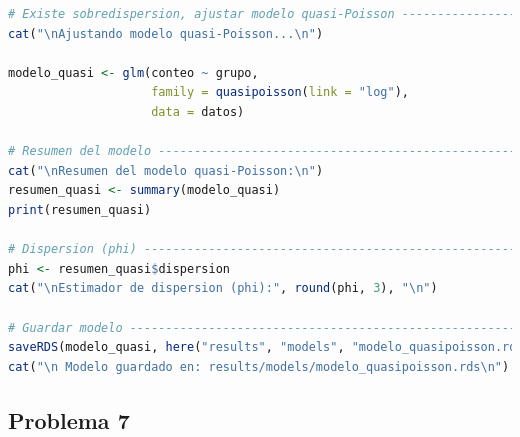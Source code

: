 \begin{lstlisting}[language=R, caption={Script 3: Modelo de Poisson e Inferencia (Inciso b).}, label={lst:script4}]
# Existe sobredispersion, ajustar modelo quasi-Poisson ------------------------
cat("\nAjustando modelo quasi-Poisson...\n")

modelo_quasi <- glm(conteo ~ grupo,
                    family = quasipoisson(link = "log"),
                    data = datos)

# Resumen del modelo ---------------------------------------------------------- 
cat("\nResumen del modelo quasi-Poisson:\n")
resumen_quasi <- summary(modelo_quasi)
print(resumen_quasi)

# Dispersion (phi) ------------------------------------------------------------
phi <- resumen_quasi$dispersion
cat("\nEstimador de dispersion (phi):", round(phi, 3), "\n")

# Guardar modelo --------------------------------------------------------------
saveRDS(modelo_quasi, here("results", "models", "modelo_quasipoisson.rds"))
cat("\n Modelo guardado en: results/models/modelo_quasipoisson.rds\n")
\end{lstlisting}

\subsection{Problema \textcolor{CIMATRed}{7}}

